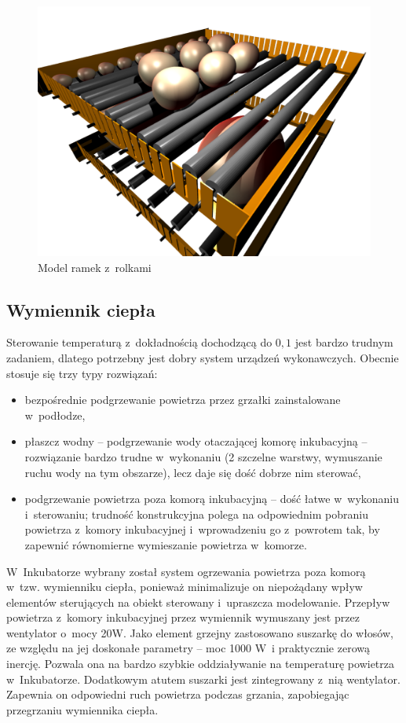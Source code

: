 \begin{figure}[t] 
	\centering\includegraphics[width=\textwidth]{figures/rolki}
	\caption{Model ramek z~rolkami}\label{rys:rolki}
\end{figure}

\subsection{Wymiennik ciepła}
Sterowanie temperaturą z~dokładnością dochodzącą do $0,1$\st{} jest bardzo
trudnym zadaniem, dlatego potrzebny jest dobry system urządzeń wykonawczych.
Obecnie stosuje się trzy typy rozwiązań:
\begin{itemize}
	\item bezpośrednie podgrzewanie powietrza przez grzałki zainstalowane w~podłodze, 
	\item płaszcz wodny -- podgrzewanie wody otaczającej komorę inkubacyjną --
		rozwiązanie bardzo trudne w~wykonaniu (2 szczelne warstwy, wymuszanie ruchu
		wody na tym obszarze), lecz daje się dość dobrze nim sterować,
	\item podgrzewanie powietrza poza komorą inkubacyjną -- dość łatwe w~wykonaniu
		i~sterowaniu; trudność konstrukcyjna polega na odpowiednim pobraniu
		powietrza z~komory inkubacyjnej i~wprowadzeniu go z~powrotem tak,
		by zapewnić równomierne wymieszanie powietrza w~komorze. 
\end{itemize}

W~Inkubatorze wybrany został system ogrzewania powietrza poza komorą w~tzw. wymienniku ciepła, ponieważ minimalizuje on niepożądany wpływ 
elementów sterujących na obiekt sterowany i~upraszcza modelowanie. Przepływ powietrza z~komory inkubacyjnej przez wymiennik wymuszany jest przez wentylator o~mocy 20W. Jako element grzejny zastosowano suszarkę do włosów, ze względu na jej doskonałe parametry -- moc 1000 W~i praktycznie zerową inercję. Pozwala ona na bardzo szybkie oddziaływanie na temperaturę powietrza w~Inkubatorze. Dodatkowym atutem 
suszarki jest zintegrowany z~nią wentylator. Zapewnia on odpowiedni ruch powietrza podczas grzania, zapobiegając przegrzaniu wymiennika ciepła. 

